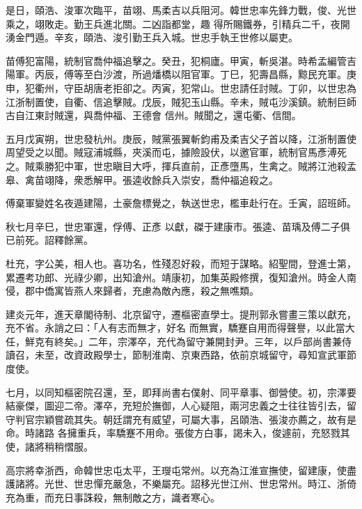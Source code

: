 \begin{pinyinscope}
 是日，頤浩、浚軍次臨平，苗翊、馬柔吉以兵阻河。韓世忠率先鋒力戰，俊、光世乘之，翊敗走。勤王兵進北關。二凶詣都堂，趣
 得所賜鐵券，引精兵二千，夜開湧金門遁。辛亥，頤浩、浚引勤王兵入城。世忠手執王世修以屬吏。



 苗傅犯富陽，統制官喬仲福追擊之。癸丑，犯桐廬。甲寅，斬吳湛。時希孟編管吉陽軍。丙辰，傅等至白沙渡，所過燔橋以阻官軍。丁巳，犯壽昌縣，黥民充軍。庚申，犯衢州，守臣胡唐老拒卻之。丙寅，犯常山。世忠請任討賊。丁卯，以世忠為江浙制置使，自衢、信追擊賊。戊辰，賊犯玉山縣。辛未，賊屯沙溪鎮。統制巨師古自江東討賊還，與喬仲福、王德會
 信州。賊聞之，還屯衢、信間。



 五月戊寅朔，世忠發杭州。庚辰，賊黨張翼斬鈞甫及柔吉父子首以降，江浙制置使周望受之以聞。賊寇浦城縣，夾溪而屯，據險設伏，以邀官軍，統制官馬彥溥死之。賊乘勝犯中軍，世忠瞋目大呼，揮兵直前，正彥墮馬，生禽之。賊將江池殺孟皋、禽苗翊降，衆悉解甲。張逵收餘兵入崇安，喬仲福追殺之。



 傅棄軍變姓名夜遁建陽，土豪詹標覺之，執送世忠，檻車赴行在。壬寅，詔班師。



 秋七月辛巳，世忠軍還，俘傅、正彥
 以獻，磔于建康市。張逵、苗瑀及傅二子俱已前死。詔釋餘黨。



 杜充，字公美，相人也。喜功名，性殘忍好殺，而短于謀略。紹聖間，登進士第，累遷考功郎、光祿少卿，出知滄州。靖康初，加集英殿修撰，復知滄州。時金人南侵，郡中僑寓皆燕人來歸者，充慮為敵內應，殺之無噍類。



 建炎元年，進天章閣待制、北京留守，遷樞密直學士。提刑郭永嘗畫三策以獻充，充不省。永誚之曰：「人有志而無才，好名
 而無實，驕蹇自用而得聲譽，以此當大任，鮮克有終矣。」二年，宗澤卒，充代為留守兼開封尹。三年，以戶部尚書兼侍讀召，未至，改資政殿學士，節制淮南、京東西路，依前京城留守，尋知宣武軍節度使。



 七月，以同知樞密院召還，至，即拜尚書右僕射、同平章事、御營使。初，宗澤要結豪傑，圖迎二帝。澤卒，充短於撫御，人心疑阻，兩河忠義之士往往皆引去，留守判官宗穎嘗疏其失。朝廷謂充有威望，可屬大事，呂頤浩、張浚亦薦之，故有是命。時諸路
 各擁重兵，率驕蹇不用命。張俊方白事，謁未入，俊遽前，充怒戮其使，諸將稍稍慴服。



 高宗將幸浙西，命韓世忠屯太平，王𤫉屯常州。以充為江淮宣撫使，留建康，使盡護諸將。光世、世忠憚充嚴急，不樂屬充。詔移光世江州、世忠常州。時江、浙倚充為重，而充日事誅殺，無制敵之方，識者寒心。



\end{pinyinscope}

